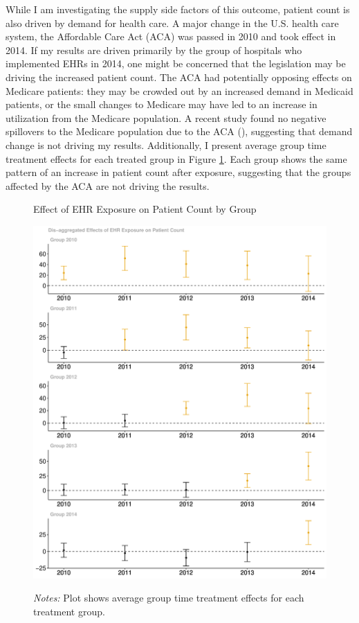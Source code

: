 \documentclass[12pt]{article}
\begin{document}
While I am investigating the supply side factors of this outcome, patient count is also driven by demand for health care. A major change in the U.S. health care system, the Affordable Care Act (ACA) was passed in 2010 and took effect in 2014. If my results are driven primarily by the group of hospitals who implemented EHRs in 2014, one might be concerned that the legislation may be driving the increased patient count. The ACA had potentially opposing effects on Medicare patients: they may be crowded out by an increased demand in Medicaid patients, or the small changes to Medicare may have led to an increase in utilization from the Medicare population. A recent study found no negative spillovers to the Medicare population due to the ACA (\cite{carey2020impact}), suggesting that demand change is not driving my results. Additionally, I present average group time treatment effects for each treated group in Figure \ref{fig:patientgroup}. Each group shows the same pattern of an increase in patient count after exposure, suggesting that the groups affected by the ACA are not driving the results. 

\begin{figure}[ht!]
    \centering
    \captionsetup{width=.6\linewidth}
    \caption{Effect of EHR Exposure on Patient Count by Group}
    \includegraphics[scale=.4]{Objects/patient_group.pdf}
    \label{fig:patientgroup}
    \vspace{2mm}
    \caption*{\footnotesize{\textit{Notes:} Plot shows average group time treatment effects for each treatment group.}}
\end{figure}
\end{document}
